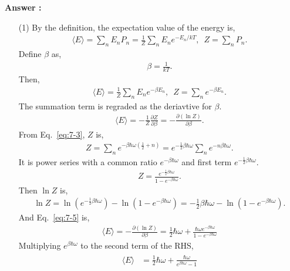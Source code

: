 \documentclass[floatfix,nofootinbib,superscriptaddress,fleqn]{revtex4-2}
\begin{document}
\noindent \textbf{Answer : }
\begin{itemize}
  \item[(1)] By the definition, the expectation value of the energy is,
  \begin{align*}
    \langle E\rangle = \sum_n E_nP_n 
    = \frac{1}{Z}\sum_n E_n e^{-E_n/kT},   \,\,\,
    Z = \sum_n P_n.
  \end{align*}
  Define $\beta$ as,
  \begin{align}\label{eq:7-4}
    \beta =\frac{1}{kT}.
  \end{align}
  Then,
  \begin{align*}
    \langle E\rangle = \frac{1}{Z}\sum_n E_n e^{-\beta E_n},   \,\,\,
    Z = \sum_n e^{-\beta E_n}.
  \end{align*}
  The summation term is regraded as the deriavtive for $\beta$.
  \begin{align}\label{eq:7-5}
    \langle E\rangle = -\frac{1}{Z}\frac{\partial Z}{\partial \beta}
    = -\frac{\partial (\ln{Z})}{\partial \beta}.
  \end{align}
  From Eq.~\eqref{eq:7-3}, $Z$ is,
  \begin{align*}
    Z = \sum_n e^{-\beta\hbar\omega(\frac{1}{2}+n)} 
    = e^{-\frac{1}{2}\beta\hbar\omega}\sum_n e^{-n\beta\hbar\omega}.
  \end{align*}
  It is power series with a common ratio $e^{-\beta\hbar\omega}$ 
  and first term $e^{-\frac{1}{2}\beta\hbar\omega}$.
  \begin{align}
    Z = \frac{e^{-\frac{1}{2}\beta\hbar\omega}}{1-e^{-\beta\hbar\omega}}.
  \end{align}
  Then $\ln{Z}$ is,
  \begin{align*}
    \ln{Z} = \ln{\left(e^{-\frac{1}{2}\beta\hbar\omega}\right)}
    -\ln{\left(1-e^{-\beta\hbar\omega}\right)}
    =-\frac{1}{2}\beta\hbar\omega
    -\ln{\left(1-e^{-\beta\hbar\omega}\right)}.
  \end{align*}
  And Eq.~\eqref{eq:7-5} is,
  \begin{align*}
      \langle E\rangle = -\frac{\partial (\ln{Z})}{\partial \beta}
      = \frac{1}{2}\hbar\omega
      +\frac{\hbar\omega e^{-\beta\hbar\omega}}{1-e^{-\beta\hbar\omega}}  
  \end{align*}
  Multiplying $e^{\beta\hbar\omega}$ to the second term of the RHS,
  \begin{align}
    \begin{split}\label{eq:7-6}
      \langle E\rangle &=\frac{1}{2}\hbar\omega
      +\frac{\hbar\omega}{e^{\beta\hbar\omega}-1} \\

\end{split}
\end{align}
\end{itemize}
\end{document}
